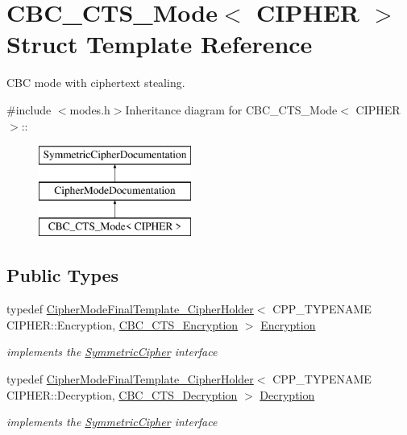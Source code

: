 \hypertarget{struct_c_b_c___c_t_s___mode}{
\section{CBC\_\-CTS\_\-Mode$<$ CIPHER $>$ Struct Template Reference}
\label{struct_c_b_c___c_t_s___mode}
}


CBC mode with ciphertext stealing.  


{\ttfamily \#include $<$modes.h$>$}Inheritance diagram for CBC\_\-CTS\_\-Mode$<$ CIPHER $>$::\begin{figure}[H]
\begin{center}
\leavevmode
\includegraphics[height=3cm]{struct_c_b_c___c_t_s___mode}
\end{center}
\end{figure}
\subsection*{Public Types}
\begin{DoxyCompactItemize}
\item 
\hypertarget{struct_c_b_c___c_t_s___mode_ab2fe00dc122add333bef62c65c06d004}{
typedef \hyperlink{class_cipher_mode_final_template___cipher_holder}{CipherModeFinalTemplate\_\-CipherHolder}$<$ CPP\_\-TYPENAME CIPHER::Encryption, \hyperlink{class_c_b_c___c_t_s___encryption}{CBC\_\-CTS\_\-Encryption} $>$ \hyperlink{struct_c_b_c___c_t_s___mode_ab2fe00dc122add333bef62c65c06d004}{Encryption}}
\label{struct_c_b_c___c_t_s___mode_ab2fe00dc122add333bef62c65c06d004}

\begin{DoxyCompactList}\small\item\em implements the \hyperlink{class_symmetric_cipher}{SymmetricCipher} interface \item\end{DoxyCompactList}\item 
\hypertarget{struct_c_b_c___c_t_s___mode_ac14b3fc83cbd70eb466b194797aa0ca9}{
typedef \hyperlink{class_cipher_mode_final_template___cipher_holder}{CipherModeFinalTemplate\_\-CipherHolder}$<$ CPP\_\-TYPENAME CIPHER::Decryption, \hyperlink{class_c_b_c___c_t_s___decryption}{CBC\_\-CTS\_\-Decryption} $>$ \hyperlink{struct_c_b_c___c_t_s___mode_ac14b3fc83cbd70eb466b194797aa0ca9}{Decryption}}
\label{struct_c_b_c___c_t_s___mode_ac14b3fc83cbd70eb466b194797aa0ca9}

\begin{DoxyCompactList}\small\item\em implements the \hyperlink{class_symmetric_cipher}{SymmetricCipher} interface \item\end{DoxyCompactList}\end{DoxyCompactItemize}


